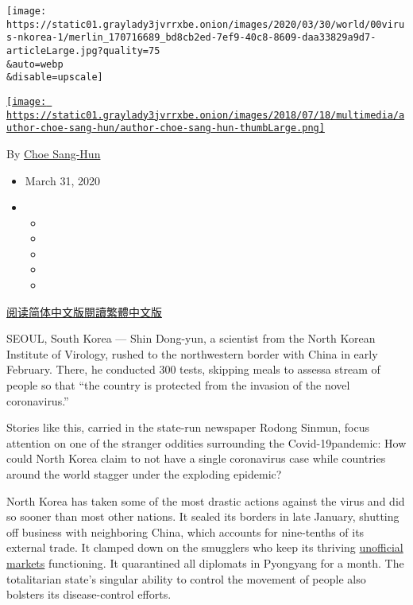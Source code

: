 \texttt{[image: https://static01.graylady3jvrrxbe.onion/images/2020/03/30/world/00virus-nkorea-1/merlin\_170716689\_bd8cb2ed-7ef9-40c8-8609-daa33829a9d7-articleLarge.jpg?quality=75\\\&auto=webp\\\&disable=upscale]}

\href{https://www.nytimes3xbfgragh.onion/by/choe-sang-hun}{\texttt{[image: https://static01.graylady3jvrrxbe.onion/images/2018/07/18/multimedia/author-choe-sang-hun/author-choe-sang-hun-thumbLarge.png]}}

By \href{https://www.nytimes3xbfgragh.onion/by/choe-sang-hun}{Choe
Sang-Hun}

\begin{itemize}
\item
  March 31, 2020
\item
  \begin{itemize}
  \item
  \item
  \item
  \item
  \item
  \end{itemize}
\end{itemize}

\href{https://cn.nytimes3xbfgragh.onion/asia-pacific/20200401/north-korea-coronavirus/}{阅读简体中文版}\href{https://cn.nytimes3xbfgragh.onion/asia-pacific/20200401/north-korea-coronavirus/zh-hant/}{閱讀繁體中文版}

SEOUL, South Korea --- Shin Dong-yun, ​a scientist from the North Korean
Institute of Virology, ​rushed to the northwestern border with China in
early February. There, he conducted 300 tests, skipping meals to assess
​a stream of people ​so that ``the country is protected from the
invasion of the novel coronavirus.''

Stories like this, carried in the state-run newspaper Rodong Sinmun,
focus attention on one of the stranger oddities surrounding the
Covid-19​ pandemic​: How could North Korea claim to not have a single
coronavirus case while countries ​around the world stagger under the
exploding epidemic?

​North Korea has taken some of the most drastic actions against the
virus and did so sooner than most other nations. It sealed its borders
in late January, shutting off business with neighboring China, which
accounts for nine-tenths of its external trade. It clamped down on the
smugglers who keep its thriving
\href{https://www.nytimes3xbfgragh.onion/2017/04/30/world/asia/north-korea-economy-marketplace.html}{unofficial
markets} functioning. It quarantined all diplomats in Pyongyang for a
month. ​The totalitarian state's singular ability to control the
movement of people​ also bolsters its disease-control efforts.

